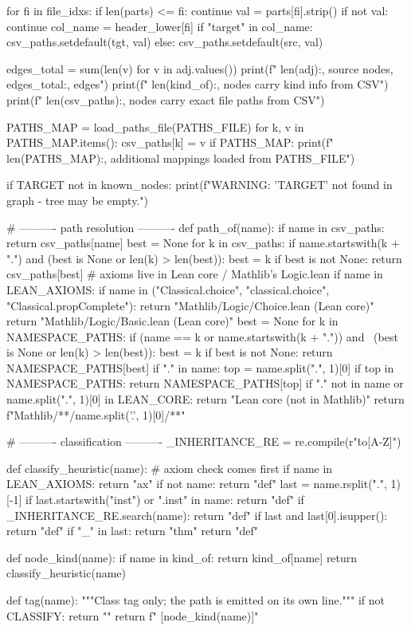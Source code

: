 \documentclass[11pt,reqno]{amsart}
\begin{document}
\begin{verbatimbox}
for fi in file_idxs:
if len(parts) <= fi:
continue
val = parts[fi].strip()
if not val:
continue
col_name = header_lower[fi]
if "target" in col_name:
csv_paths.setdefault(tgt, val)
else:
csv_paths.setdefault(src, val)

edges_total = sum(len(v) for v in adj.values())
print(f"  {len(adj):,} source nodes, {edges_total:,} edges")
print(f"  {len(kind_of):,} nodes carry kind info from CSV")
print(f"  {len(csv_paths):,} nodes carry exact file paths from CSV")

PATHS_MAP = load_paths_file(PATHS_FILE)
for k, v in PATHS_MAP.items():
csv_paths[k] = v
if PATHS_MAP:
print(f"  {len(PATHS_MAP):,} additional mappings loaded from {PATHS_FILE}")

if TARGET not in known_nodes:
print(f"WARNING: '{TARGET}' not found in graph - tree may be empty.")

# ---------- path resolution ----------
def path_of(name):
if name in csv_paths:
return csv_paths[name]
best = None
for k in csv_paths:
if name.startswith(k + ".") and (best is None or len(k) > len(best)):
best = k
if best is not None:
return csv_paths[best]
# axioms live in Lean core / Mathlib's Logic.lean
if name in LEAN_AXIOMS:
if name in ("Classical.choice", "classical.choice",
"Classical.propComplete"):
return "Mathlib/Logic/Choice.lean (Lean core)"
return "Mathlib/Logic/Basic.lean (Lean core)"
best = None
for k in NAMESPACE_PATHS:
if (name == k or name.startswith(k + ".")) and \
(best is None or len(k) > len(best)):
best = k
if best is not None:
return NAMESPACE_PATHS[best]
if "." in name:
top = name.split(".", 1)[0]
if top in NAMESPACE_PATHS:
return NAMESPACE_PATHS[top]
if "." not in name or name.split(".", 1)[0] in LEAN_CORE:
return "Lean core (not in Mathlib)"
return f"Mathlib/**/{name.split('.', 1)[0]}/**"

# ---------- classification ----------
_INHERITANCE_RE = re.compile(r"\.to[A-Z]")

def classify_heuristic(name):
# axiom check comes first
if name in LEAN_AXIOMS:
return "ax"
if not name:
return "def"
last = name.rsplit(".", 1)[-1]
if last.startswith("inst") or ".inst" in name:
return "def"
if _INHERITANCE_RE.search(name):
return "def"
if last and last[0].isupper():
return "def"
if "_" in last:
return "thm"
return "def"

def node_kind(name):
if name in kind_of:
return kind_of[name]
return classify_heuristic(name)

def tag(name):
"""Class tag only; the path is emitted on its own line."""
if not CLASSIFY:
return ""
return f"  [{node_kind(name)}]"


\end{verbatimbox}
\end{document}
